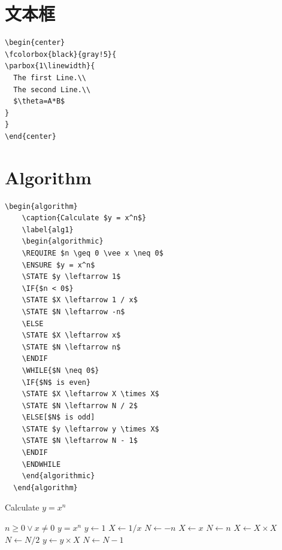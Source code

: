 \documentclass[onecolumn,oneside]{SUSTechHomework}
\begin{document}
\section{文本框}
\begin{lstlisting}
\begin{center}
\fcolorbox{black}{gray!5}{
\parbox{1\linewidth}{
  The first Line.\\
  The second Line.\\
  $\theta=A*B$      
}
}
\end{center}
\end{lstlisting}
\begin{center}
\end{center}
\section{Algorithm}
\begin{lstlisting}[title = \textbf{Algorithm Design}]
  \begin{algorithm}
    \caption{Calculate $y = x^n$}
    \label{alg1}
    \begin{algorithmic}
    \REQUIRE $n \geq 0 \vee x \neq 0$
    \ENSURE $y = x^n$
    \STATE $y \leftarrow 1$
    \IF{$n < 0$}
    \STATE $X \leftarrow 1 / x$
    \STATE $N \leftarrow -n$
    \ELSE
    \STATE $X \leftarrow x$
    \STATE $N \leftarrow n$
    \ENDIF
    \WHILE{$N \neq 0$}
    \IF{$N$ is even}
    \STATE $X \leftarrow X \times X$
    \STATE $N \leftarrow N / 2$
    \ELSE[$N$ is odd]
    \STATE $y \leftarrow y \times X$
    \STATE $N \leftarrow N - 1$
    \ENDIF
    \ENDWHILE
    \end{algorithmic}
  \end{algorithm}
\end{lstlisting}
\begin{algorithm}
  \caption{Calculate $y = x^n$}
  \label{alg1}
  \begin{algorithmic}
  \REQUIRE $n \geq 0 \vee x \neq 0$
  \ENSURE $y = x^n$
  \STATE $y \leftarrow 1$
  \STATE $X \leftarrow 1 / x$
  \STATE $N \leftarrow -n$
  \ELSE
  \STATE $X \leftarrow x$
  \STATE $N \leftarrow n$
  \ENDIF
  \STATE $X \leftarrow X \times X$
  \STATE $N \leftarrow N / 2$
  \ELSE[$N$ is odd]
  \STATE $y \leftarrow y \times X$
  \STATE $N \leftarrow N - 1$
  \ENDIF
  \ENDWHILE
  \end{algorithmic}
\end{algorithm}
\end{document}
